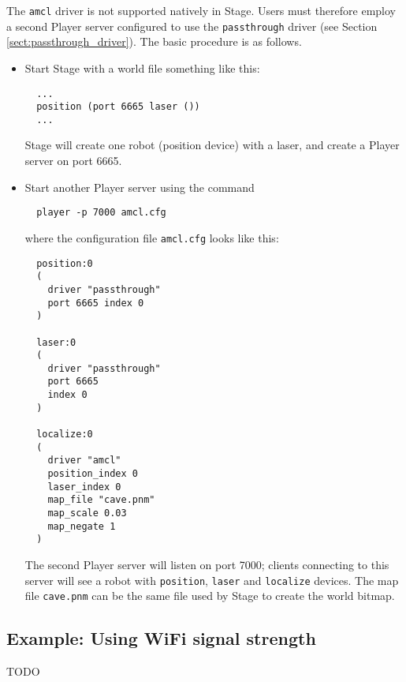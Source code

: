 The {\tt amcl} driver is not supported natively in Stage.
Users must therefore employ a second Player server configured to use
the {\tt passthrough} driver (see Section
\ref{sect:passthrough_driver}).  The basic procedure is as follows.
%
\begin{itemize}
\item Start Stage with a world file something like this:
  \begin{small}
  \begin{verbatim}
  ...
  position (port 6665 laser ())
  ...
  \end{verbatim}
  \end{small}
Stage will create one robot (position device) with a laser, and create
a Player server on port 6665.
\item Start another Player server using the command
  \begin{verbatim}
  player -p 7000 amcl.cfg
  \end{verbatim}
where the configuration file {\tt amcl.cfg} looks like this:
  \begin{small}
  \begin{verbatim}
  position:0 
  (
    driver "passthrough" 
    port 6665 index 0
  )

  laser:0 
  (
    driver "passthrough" 
    port 6665 
    index 0
  ) 

  localize:0 
  (
    driver "amcl" 
    position_index 0 
    laser_index 0 
    map_file "cave.pnm"
    map_scale 0.03
    map_negate 1
  )
  \end{verbatim}
  \end{small}
The second Player server will listen on port 7000; clients connecting
to this server will see a robot with {\tt position}, {\tt laser} and
{\tt localize} devices.  The map file {\tt cave.pnm} can be the same
file used by Stage to create the world bitmap.
\end{itemize}



\subsection*{Example: Using WiFi signal strength}

TODO


